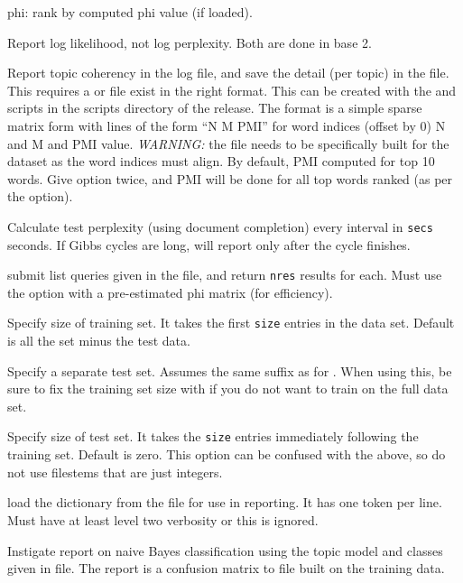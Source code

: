 \documentclass[a4paper,english]{article}
\begin{document}
\begin{Description}
\begin{Description}
\item[phi:] rank by computed phi value (if loaded).
\end{Description}
\item[\Opt{-O}] Report log likelihood, not log perplexity.  Both
are done in base 2.
\item[\Opt{-p}] Report topic coherency in the log file, 
and save the detail (per topic) in the  file.
This requires 
a  or  file exist
in the right format.  This can be created with the 
 and
 scripts in the scripts directory of the release.
The format is a simple sparse matrix form with lines
of the form ``N M PMI'' for word indices
(offset by 0) N and M and PMI value.
\emph{WARNING:}  the file  needs to be specifically built for 
the dataset as the word indices must align.
By default, PMI computed for top 10 words.
Give option twice, and PMI will be done for all top words
ranked (as per the  option).
\item[\OptArg{-P}{secs}]  
Calculate test perplexity (using document completion)
every interval in \texttt{secs} seconds.  If Gibbs cycles are long,
will report only after the cycle finishes.
\item[\OptArg{-Q}{nres,file}]  
submit list queries given in the file, and return \texttt{nres}
results for each.  Must use the  option with
a pre-estimated phi matrix (for efficiency).
\item[\OptArg{-t}{size}]  Specify size of training set.  It takes the
first \texttt{size} entries in the data set. Default is all the
set minus the test data.
\item[\OptArg{-T}{filestem}]  Specify a separate test set.  
Assumes the same suffix as for .
When using this, be sure to fix the training set size with 
 if you do not want to train on the full
data set.
\item[\OptArg{-T}{size}]  Specify size of test set.  It takes the
\texttt{size} entries immediately following the training set. 
Default is zero.  This option can be confused with the above, so do not use 
filestems that are just integers.
\item[\Opt{-V}]  load the dictionary from the
 file for use in reporting.  It has one token per line.
Must have at least level two verbosity or this is ignored.
\item[\Opt{-X}]  Instigate report on naive Bayes classification
using the topic model and classes given in  file.
The report is a confusion matrix to file  built on
the training data.
\end{Description}
\end{document}
